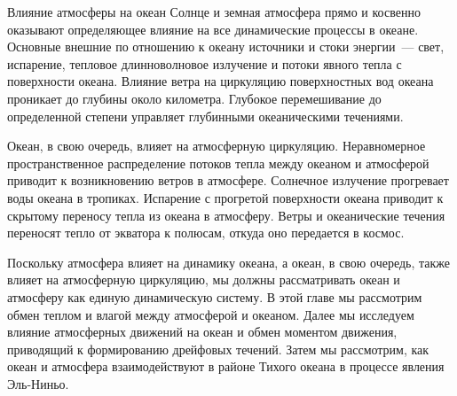 
\begin{chapter}{Влияние атмосферы на океан}
Солнце и земная атмосфера прямо и косвенно оказывают определяющее
влияние на все динамические процессы в океане. Основные внешние по
отношению к океану источники и стоки энергии~--- свет, испарение,
тепловое длинноволновое излучение и потоки явного тепла с поверхности
океана. Влияние ветра на циркуляцию поверхностных вод океана проникает
до глубины около километра. Глубокое перемешивание до определенной
степени управляет глубинными океаническими течениями.
%

Океан, в свою очередь, влияет на атмосферную циркуляцию. Неравномерное
пространственное распределение потоков тепла между океаном и
атмосферой приводит к возникновению ветров в атмосфере. Солнечное
излучение прогревает воды океана в тропиках. Испарение с прогретой
поверхности океана приводит к скрытому переносу тепла из океана в
атмосферу. Ветры и океанические течения переносят тепло от экватора к
полюсам, откуда оно передается в космос.
%

Поскольку атмосфера влияет на динамику океана, а океан, в свою
очередь, также влияет на атмосферную циркуляцию, мы должны
рассматривать океан и атмосферу как единую динамическую систему. В
этой главе мы рассмотрим обмен теплом и влагой между атмосферой и
океаном. Далее мы исследуем влияние атмосферных движений на океан и
обмен моментом движения, приводящий к формированию дрейфовых
течений. Затем мы рассмотрим, как океан и атмосфера взаимодействуют в
районе Тихого океана в процессе явления Эль-Ниньо.
%


\end{chapter}
